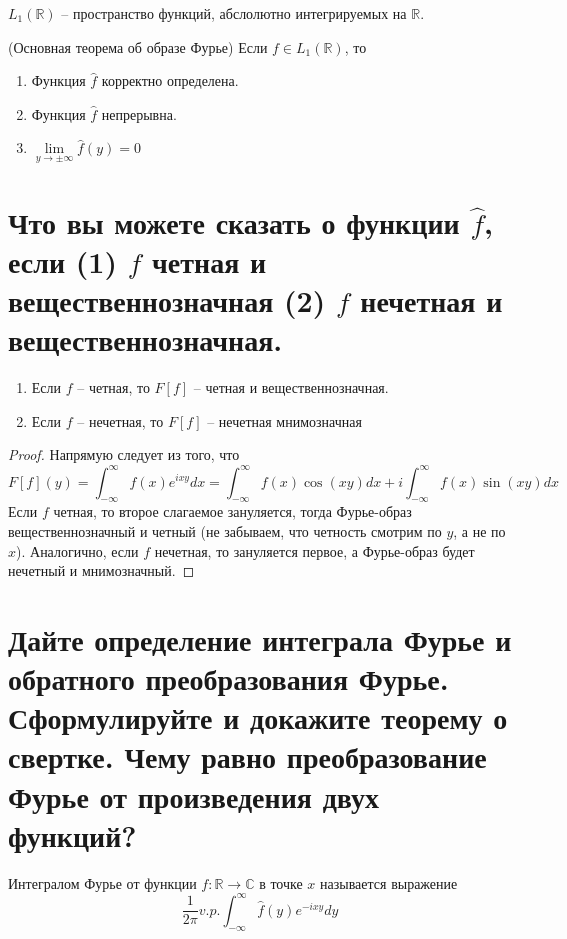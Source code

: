 \begin{definition}
    $L_1(\mathbb{R})$ -- пространство функций, абслолютно интегрируемых на $\mathbb{R}$.
\end{definition}

\begin{theorem} (Основная теорема об образе Фурье)
    Если $f\in L_1(\mathbb{R})$, то
    \begin{enumerate}
        \item Функция $\hat{f}$ корректно определена.
        \item Функция $\hat{f}$ непрерывна.
        \item $\lim\limits_{y\to\pm\infty}\hat{f}(y) = 0$
    \end{enumerate}
\end{theorem}

\section{Что вы можете сказать о функции $\hat{f}$, если (1) $f$ четная и вещественнозначная (2) $f$ нечетная и вещественнозначная.}
\begin{lemma}
    \begin{enumerate}
        \item Если $f$ -- четная, то $F[f]$ -- четная и вещественнозначная.
        \item Если $f$ -- нечетная, то $F[f]$ -- нечетная мнимозначная
    \end{enumerate}
\end{lemma}

\begin{proof}
    Напрямую следует из того, что
    $$
    F[f](y) = \int_{-\infty}^{\infty}f(x)e^{ixy}dx
    =
    \int_{-\infty}^{\infty}f(x)\cos(xy)dx + i\int_{-\infty}^{\infty}f(x)\sin(xy)dx
    $$
    Если $f$ четная, то второе слагаемое зануляется, тогда Фурье-образ вещественнозначный и четный (не забываем, что четность смотрим по $y$, а не по $x$). Аналогично, если $f$ нечетная, то зануляется первое, а Фурье-образ будет нечетный и мнимозначный.
\end{proof}

\section{Дайте определение интеграла Фурье и обратного преобразования Фурье. Сформулируйте и докажите теорему о свертке. Чему равно преобразование Фурье от произведения двух функций?}
\begin{definition}
    Интегралом Фурье от функции $f\colon \mathbb{R}\to\mathbb{C}$ в точке $x$ называется выражение $$\frac{1}{2\pi} v.p.\int_{-\infty}^{\infty}\hat{f}(y)e^{-ixy}dy$$
\end{definition}

